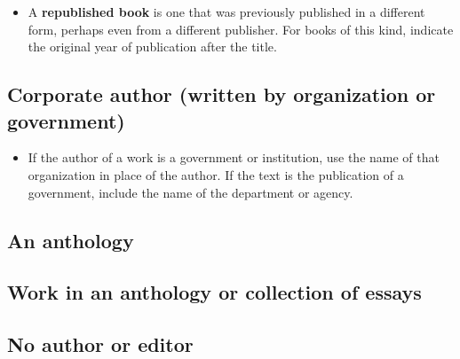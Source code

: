 {

\begin{itemize}\item A \textbf{republished book} is one that was previously published in a different form, perhaps even from a different publisher. For books of this kind, indicate the original year of publication after the title. \end{itemize}

\subsection{Corporate author (written by organization or government)}



\medskip 


\begin{itemize}\item If the author of a work is a government or institution, use the name of that organization in place of the author. If the text is the publication of a government, include the name of the department or agency. \end{itemize}

\subsection{An anthology}

\subsection{Work in an anthology or collection of essays}

\subsection{No author or editor}

}
